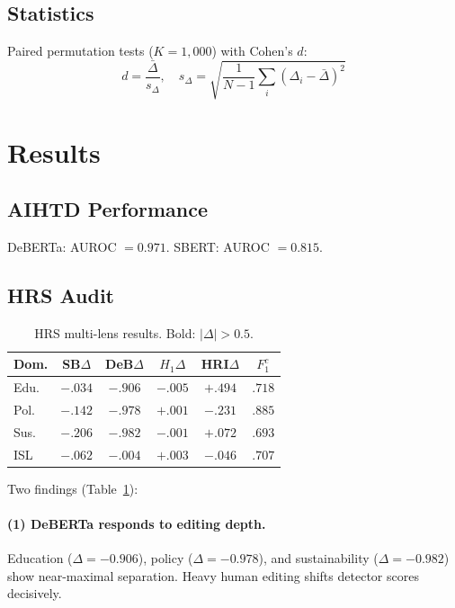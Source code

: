 \documentclass[11pt]{article}
\begin{document}
\subsection{Statistics}

Paired permutation tests ($K = 1{,}000$) with Cohen's $d$:
\begin{equation}
    d = \frac{\bar{\Delta}}{s_{\Delta}}, \quad s_{\Delta} = \sqrt{\frac{1}{N-1}\sum_i (\Delta_i - \bar{\Delta})^2}
\end{equation}

\section{Results}

\subsection{AIHTD Performance}

DeBERTa: AUROC $= 0.971$. SBERT: AUROC $= 0.815$.

\subsection{HRS Audit}

\begin{table}[t]
\centering
\small
\caption{HRS multi-lens results. Bold: $|\Delta| > 0.5$.}
\label{tab:hrs}
\begin{tabular}{@{}lccccc@{}}
\toprule
\textbf{Dom.} & \textbf{SB$\Delta$} & \textbf{DeB$\Delta$} & \textbf{$H_1\Delta$} & \textbf{HRI$\Delta$} & \textbf{$F_1^c$} \\
\midrule
Edu.  & $-.034$ & $\mathbf{-.906}$ & $-.005$ & $+.494$ & $.718$ \\
Pol.  & $-.142$ & $\mathbf{-.978}$ & $+.001$ & $-.231$ & $.885$ \\
Sus.  & $-.206$ & $\mathbf{-.982}$ & $-.001$ & $+.072$ & $.693$ \\
\midrule
ISL   & $-.062$ & $-.004$          & $+.003$ & $-.046$ & $.707$ \\
\bottomrule
\end{tabular}
\end{table}

Two findings (Table~\ref{tab:hrs}):

\paragraph{(1) DeBERTa responds to editing depth.} Education ($\Delta = -0.906$), policy ($\Delta = -0.978$), and sustainability ($\Delta = -0.982$) show near-maximal separation. Heavy human editing shifts detector scores decisively.
\end{document}
